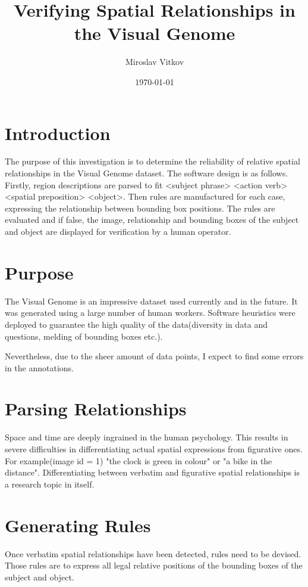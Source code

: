 \documentclass{article}
\title{Verifying Spatial Relationships in the Visual Genome}
\author{Miroslav Vitkov}
\date{\today}
\begin{document}
\maketitle


\section{Introduction}
The purpose of this investigation is to determine the reliability of relative spatial relationships in the Visual Genome dataset.
The software design is as follows.
Firstly, region descriptions are parsed to fit <subject phrase> <action verb> <spatial preposition> <object>.
Then rules are manufactured for each case, expressing the relationship between bounding box positions.
The rules are evaluated and if false, the image, relationship and bounding boxes of the subject and object are displayed for verification by a human operator.


\section{Purpose}
The Visual Genome is an impressive dataset used currently and in the future.
It was generated using a large number of human workers.
Software heuristics were deployed to guarantee the high quality of the data(diversity in data and questions, melding of bounding boxes etc.)\parencite{krishna}.

Nevertheless, due to the sheer amount of data points, I expect to find some errors in the annotations.


\section{Parsing Relationships}
Space and time are deeply ingrained in the human psychology\parencite{zlatev}.
This results in severe difficulties in differentiating actual spatial expressions from figurative ones.
For example(image id = 1) "the clock is green in colour" or "a bike in the distance".
Differentiating between verbatim and figurative spatial relationships is a research topic in itself.


\section{Generating Rules}
Once verbatim spatial relationships have been detected, rules need to be devised.
Those rules are to express all legal relative positions of the bounding boxes of the subject and object.
\end{document}
